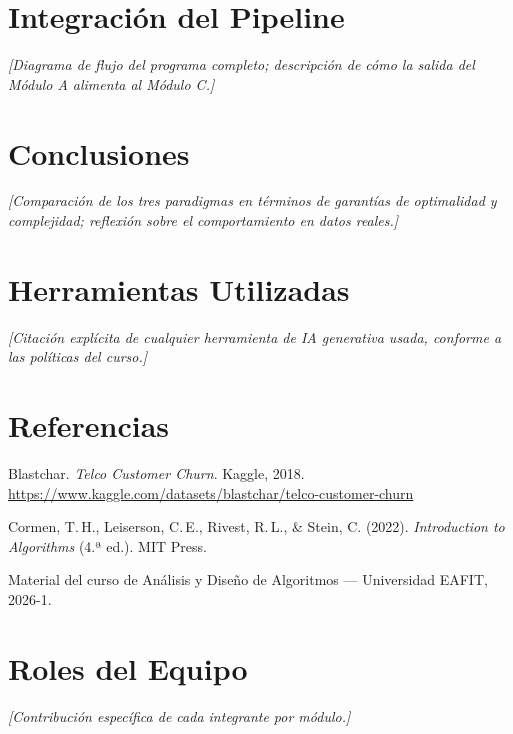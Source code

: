 \documentclass[12pt, a4paper]{article}
\begin{document}
\section{Integración del Pipeline}
\textit{[Diagrama de flujo del programa completo; descripción de cómo la salida del Módulo A alimenta al Módulo C.]}

\section{Conclusiones}
\textit{[Comparación de los tres paradigmas en términos de garantías de optimalidad y complejidad; reflexión sobre el comportamiento en datos reales.]}

\section{Herramientas Utilizadas}
\textit{[Citación explícita de cualquier herramienta de IA generativa usada, conforme a las políticas del curso.]}

\section{Referencias}

\begin{enumerate}[label={[\arabic*]}]
  \item Blastchar. \textit{Telco Customer Churn}. Kaggle, 2018.
        \url{https://www.kaggle.com/datasets/blastchar/telco-customer-churn}
  \item Cormen, T.\,H., Leiserson, C.\,E., Rivest, R.\,L., \& Stein, C. (2022).
        \textit{Introduction to Algorithms} (4.ª ed.). MIT Press.
  \item Material del curso de Análisis y Diseño de Algoritmos — Universidad EAFIT, 2026-1.
\end{enumerate}

\section{Roles del Equipo}
\textit{[Contribución específica de cada integrante por módulo.]}
\end{document}

